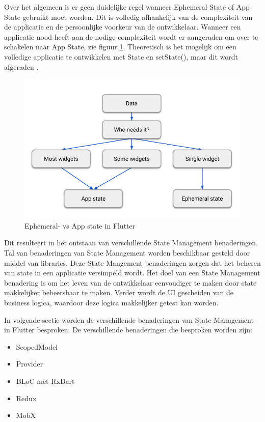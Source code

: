 Over het algemeen is er geen duidelijke regel wanneer Ephemeral State of App State gebruikt moet worden. Dit is volledig afhankelijk van de complexiteit van de applicatie en de persoonlijke voorkeur van de ontwikkelaar.
Wanneer een applicatie nood heeft aan de nodige complexiteit wordt er aangeraden om over te schakelen naar App State, zie figuur \ref{fig:ephemeral-vs-app-state-flutter}. Theoretisch is het mogelijk om een volledige applicatie te ontwikkelen met State en setState(), maar dit wordt afgeraden \autocite{Developers2019}.
\begin{figure}[H]
    \includegraphics[width=\linewidth]{img/stand-van-zaken/ephemeral-vs-app-state-flutter.png}
    \caption{Ephemeral- vs App state in Flutter \autocite{Developers2019}}
    \label{fig:ephemeral-vs-app-state-flutter}
\end{figure}

Dit resulteert in het ontstaan van verschillende State Management benaderingen. Tal van benaderingen van State Management worden beschikbaar gesteld door middel van libraries. Deze State Mangement benaderingen zorgen dat het beheren van state in een applicatie versimpeld wordt.
Het doel van een State Management benadering is om het leven van de ontwikkelaar eenvoudiger te
maken door state makkelijker beheersbaar te maken. Verder wordt de UI gescheiden van
de business logica, waardoor deze logica makkelijker getest kan worden.

In volgende sectie worden de verschillende benaderingen van State Management in Flutter besproken.
De verschillende benaderingen die besproken worden zijn: 
\begin{itemize}
    \item ScopedModel
    \item Provider
    \item BLoC met RxDart
    \item Redux
    \item MobX
\end{itemize}


